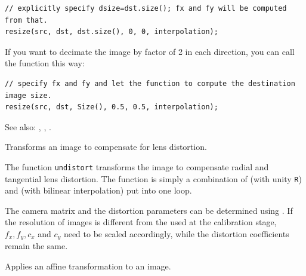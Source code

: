 \begin{lstlisting}
// explicitly specify dsize=dst.size(); fx and fy will be computed from that.
resize(src, dst, dst.size(), 0, 0, interpolation);
\end{lstlisting}

If you want to decimate the image by factor of 2 in each direction, you can call the function this way:

\begin{lstlisting}
// specify fx and fy and let the function to compute the destination image size.
resize(src, dst, Size(), 0.5, 0.5, interpolation);
\end{lstlisting}

See also: , , .

Transforms an image to compensate for lens distortion.

\begin{description}
\end{description}

The function \texttt{undistort} transforms the image to compensate
radial and tangential lens distortion. The function is simply a combination of  (with unity \texttt{R}) and  (with bilinear interpolation) put into one loop.

The camera matrix and the distortion parameters can be determined using
. If the resolution of images is different from the used at the calibration stage, $f_x, f_y, c_x$ and $c_y$
need to be scaled accordingly, while the distortion coefficients remain the same.

Applies an affine transformation to an image.

